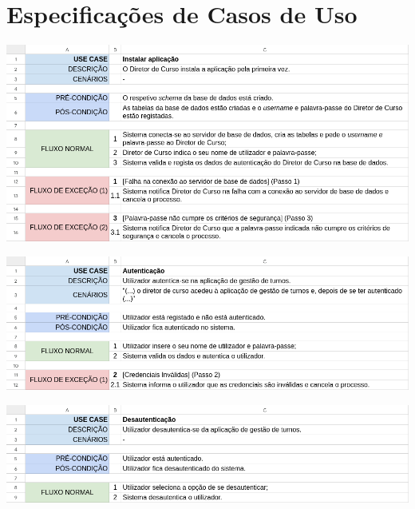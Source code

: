 \documentclass[a4paper,12pt]{scrreprt}
\begin{document}

\chapter{Especificações de Casos de Uso}
\vspace{1cm}

\begin{minipage}{\textwidth}
    \centering
    \includegraphics[width=1\textwidth]{images/use-cases/descriptions/01-Instalar aplicação.png}
    \label{fig:3-01-instalar_aplicacao}
\end{minipage}

\begin{minipage}{\textwidth}
    \centering
    \includegraphics[width=1\textwidth]{images/use-cases/descriptions/02-Autenticação.png}
    \label{fig:3-02-autenticacao}
\end{minipage}

\begin{minipage}{\textwidth}
    \centering
    \includegraphics[width=1\textwidth]{images/use-cases/descriptions/03-Desautenticação.png}
    \label{fig:3-03-desautenticacao}
\end{minipage}
\end{document}
